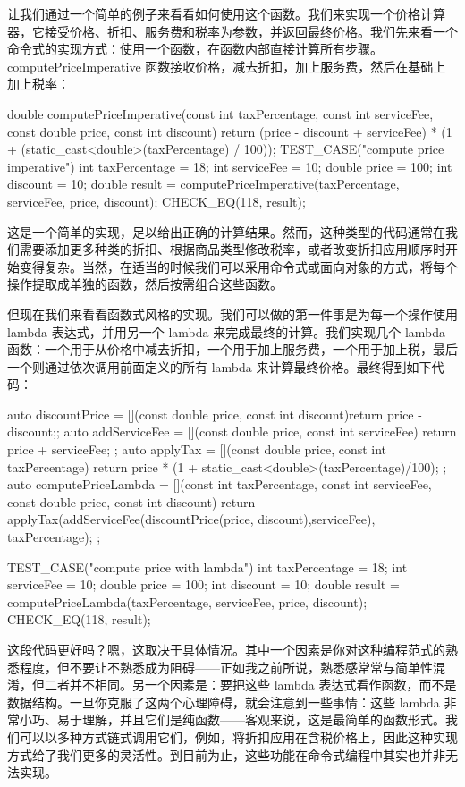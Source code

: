 让我们通过一个简单的例子来看看如何使用这个函数。我们来实现一个价格计算器，它接受价格、折扣、服务费和税率为参数，并返回最终价格。我们先来看一个命令式的实现方式：使用一个函数，在函数内部直接计算所有步骤。computePriceImperative 函数接收价格，减去折扣，加上服务费，然后在基础上加上税率：

\begin{cpp}
double computePriceImperative(const int taxPercentage, const int
serviceFee, const double price, const int discount){
  return (price - discount + serviceFee) * (1 + (static_cast<double>(taxPercentage) / 100));
}
TEST_CASE("compute price imperative"){
  int taxPercentage = 18;
  int serviceFee = 10;
  double price = 100;
  int discount = 10;
  double result =
  computePriceImperative(taxPercentage, serviceFee, price, discount);
  CHECK_EQ(118, result);
}
\end{cpp}

这是一个简单的实现，足以给出正确的计算结果。然而，这种类型的代码通常在我们需要添加更多种类的折扣、根据商品类型修改税率，或者改变折扣应用顺序时开始变得复杂。当然，在适当的时候我们可以采用命令式或面向对象的方式，将每个操作提取成单独的函数，然后按需组合这些函数。

但现在我们来看看函数式风格的实现。我们可以做的第一件事是为每一个操作使用 lambda 表达式，并用另一个 lambda 来完成最终的计算。我们实现几个 lambda 函数：一个用于从价格中减去折扣，一个用于加上服务费，一个用于加上税，最后一个则通过依次调用前面定义的所有 lambda 来计算最终价格。最终得到如下代码：

\begin{cpp}
auto discountPrice = [](const double price, const int discount){return
price - discount;};
auto addServiceFee = [](const double price, const int serviceFee){
return price + serviceFee; };
auto applyTax = [](const double price, const int taxPercentage){
return price * (1 + static_cast<double>(taxPercentage)/100); };
auto computePriceLambda = [](const int taxPercentage, const int
serviceFee, const double price, const int discount){
  return applyTax(addServiceFee(discountPrice(price, discount),serviceFee), taxPercentage);
};

TEST_CASE("compute price with lambda"){
  int taxPercentage = 18;
  int serviceFee = 10;
  double price = 100;
  int discount = 10;
  double result = computePriceLambda(taxPercentage, serviceFee, price,
  discount);
  CHECK_EQ(118, result);
}
\end{cpp}

这段代码更好吗？嗯，这取决于具体情况。其中一个因素是你对这种编程范式的熟悉程度，但不要让不熟悉成为阻碍——正如我之前所说，熟悉感常常与简单性混淆，但二者并不相同。另一个因素是：要把这些 lambda 表达式看作函数，而不是数据结构。一旦你克服了这两个心理障碍，就会注意到一些事情：这些 lambda 非常小巧、易于理解，并且它们是纯函数——客观来说，这是最简单的函数形式。我们可以以多种方式链式调用它们，例如，将折扣应用在含税价格上，因此这种实现方式给了我们更多的灵活性。到目前为止，这些功能在命令式编程中其实也并非无法实现。

